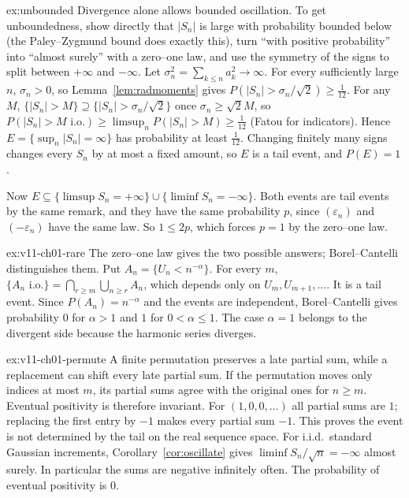 \begin{solution}{ex:unbounded}
\idea Divergence alone allows bounded oscillation. To get unboundedness, show directly that $|S_n|$ is large with probability bounded below
(the Paley--Zygmund bound does exactly this), turn ``with positive probability'' into ``almost surely'' with a zero--one law, and use the symmetry
of the signs to split between $+\infty$ and $-\infty$.
\writeup Let $\sigma_n^2=\sum_{k\le n}a_k^2\to\infty$. For every sufficiently large $n$, $\sigma_n>0$, so Lemma~\ref{lem:radmoments} gives $P(|S_n|>\sigma_n/\sqrt2)\ge\frac1{12}$. For any
$M$, $\{|S_n|>M\}\supseteq\{|S_n|>\sigma_n/\sqrt2\}$ once $\sigma_n\ge\sqrt2M$, so $P(|S_n|>M\text{ i.o.})\ge\limsup_nP(|S_n|>M)\ge\frac1{12}$ (Fatou
for indicators). Hence $E=\{\sup_n|S_n|=\infty\}$ has probability at least $\frac1{12}$. Changing finitely many signs changes every $S_n$ by at most a
fixed amount, so $E$ is a tail event, and $P(E)=1$.

Now $E\subseteq\{\limsup S_n=+\infty\}\cup\{\liminf S_n=-\infty\}$. Both events are tail events by the same remark, and they have the same probability
$p$, since $(\varepsilon_n)$ and $(-\varepsilon_n)$ have the same law. So $1\le2p$, which forces $p=1$ by the zero--one law.
\end{solution}


\begin{solution}{ex:v11-ch01-rare}
\idea The zero--one law gives the two possible answers; Borel--Cantelli distinguishes them.
\writeup Put $A_n=\{U_n<n^{-\alpha}\}$. For every $m$, $\{A_n\text{ i.o.}\}=\bigcap_{r\ge m}\bigcup_{n\ge r}A_n$, which depends only on $U_m,U_{m+1},\dots$. It is a tail event. Since $P(A_n)=n^{-\alpha}$ and the events are independent, Borel--Cantelli gives probability $0$ for $\alpha>1$ and $1$ for $0<\alpha\le1$. The case $\alpha=1$ belongs to the divergent side because the harmonic series diverges.
\end{solution}

\begin{solution}{ex:v11-ch01-permute}
\idea A finite permutation preserves a late partial sum, while a replacement can shift every late partial sum.
\writeup If the permutation moves only indices at most $m$, its partial sums agree with the original ones for $n\ge m$. Eventual positivity is therefore invariant. For $(1,0,0,\ldots)$ all partial sums are $1$; replacing the first entry by $-1$ makes every partial sum $-1$. This proves the event is not determined by the tail on the real sequence space. For i.i.d.\ standard Gaussian increments, Corollary~\ref{cor:oscillate} gives $\liminf S_n/\sqrt n=-\infty$ almost surely. In particular the sums are negative infinitely often. The probability of eventual positivity is $0$.
\end{solution}

